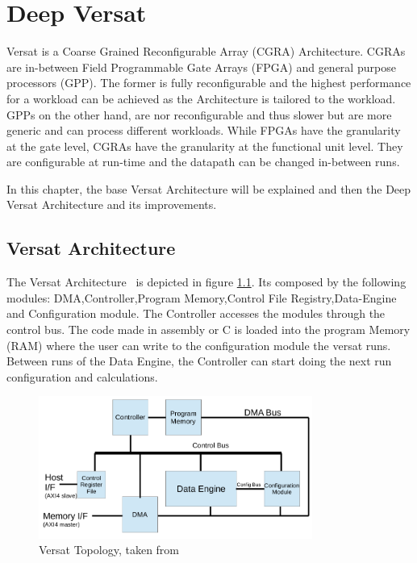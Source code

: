 \chapter{Deep Versat}
\label{chapter:DeepVersat}

\quad Versat is a Coarse Grained Reconfigurable Array (CGRA) Architecture. CGRAs are in-between Field Programmable Gate Arrays (FPGA) and general purpose processors (GPP).
The former is fully reconfigurable and the highest performance for a workload can be achieved as the Architecture is tailored to the workload.
GPPs on the other hand, are nor reconfigurable and thus slower but are more generic and can process different workloads.
While FPGAs have the granularity at the gate level, CGRAs have the granularity at the functional unit level. They are configurable at run-time and the datapath can be
changed in-between runs.   

In this chapter, the base Versat Architecture will be explained and then the Deep Versat Architecture
 and its improvements.

\section{Versat Architecture}

\quad The Versat Architecture~\cite{sousa:compiler,sousa:controller,sousa:FFT,sousa:versat2016} 
is depicted in figure \ref{figure:oldversat}. Its composed by the following modules: DMA,Controller,Program Memory,Control File Registry,Data-Engine and Configuration module.
The Controller accesses the modules through the control bus. The code made in assembly or C is loaded into the program Memory (RAM) where the user
can write to the configuration module the versat runs. Between runs of the Data Engine,
 the Controller can start doing the next run configuration and calculations.


\begin{figure}[!htbp]
    \centering
    \includegraphics[width=0.8\textwidth]{Figures/top.png}
    \caption{Versat Topology, taken from~\cite{sousa:controller}}
    \label{figure:oldversat}
\end{figure} 

